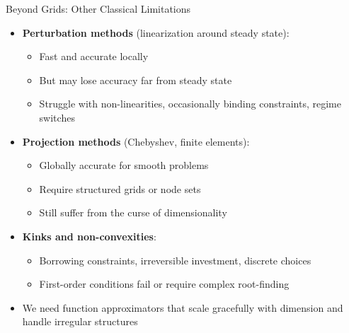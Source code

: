 \documentclass[10pt,english,aspectratio=169]{beamer}
\begin{document}
\begin{frame}{Beyond Grids: Other Classical Limitations}
\begin{itemize}
  \item \textbf{Perturbation methods} (linearization around steady state):
    \begin{itemize}
      \item Fast and accurate locally
      \item But may lose accuracy far from steady state
      \item Struggle with non-linearities, occasionally binding constraints, regime switches
    \end{itemize}
  \medskip
  \item \textbf{Projection methods} (Chebyshev, finite elements):
    \begin{itemize}
      \item Globally accurate for smooth problems
      \item Require structured grids or node sets
      \item Still suffer from the curse of dimensionality
    \end{itemize}
  \medskip
  \item \textbf{Kinks and non-convexities}:
    \begin{itemize}
      \item Borrowing constraints, irreversible investment, discrete choices
      \item First-order conditions fail or require complex root-finding
    \end{itemize}
  \medskip
  \item We need function approximators that scale gracefully with dimension and handle irregular structures
\end{itemize}
\end{frame}
\end{document}
